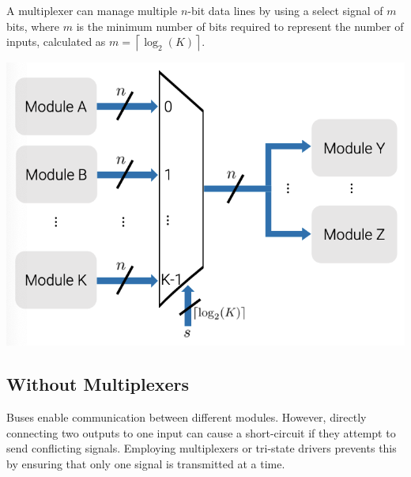 \documentclass[12pt,openany, tikz,border=10pt]{book}
\begin{document}
					  \begin{minipage}{0.48\textwidth}
						A multiplexer can manage multiple \(n\)-bit data lines by using a select signal of \(m\) bits, where \(m\) is the minimum number of bits required to represent the number of inputs, calculated as \(m = \left\lceil \log_2(K) \right\rceil\).

					\end{minipage}
					\hfill
					\begin{minipage}{0.48\textwidth}
						\includegraphics[width=\textwidth]{circuits/11.1.1.png} %

					\end{minipage}
					  
					  \subsection{Without Multiplexers} 
					  
					  Buses enable communication between different modules. However, directly connecting two outputs to one input can cause a short-circuit if they attempt to send conflicting signals. Employing multiplexers or tri-state drivers prevents this by ensuring that only one signal is transmitted at a time.
					  
\end{document}
